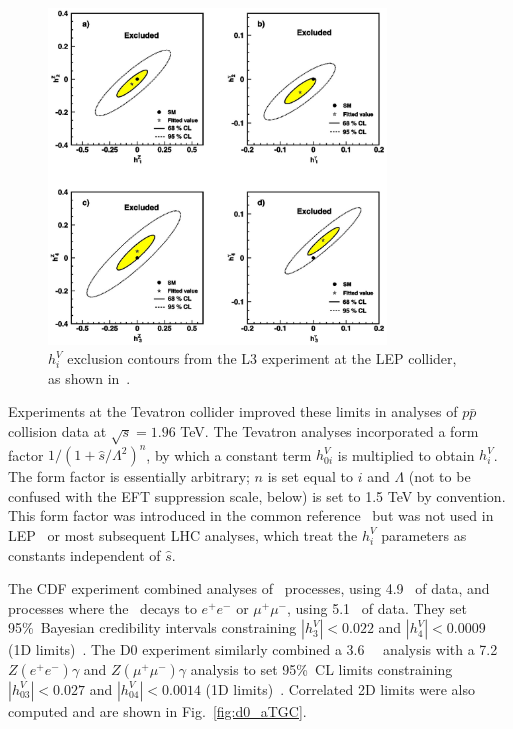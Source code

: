 \documentclass[oneside, letterpaper, 12pt, oldfontcommands]{memoir}
\begin{document}
\begin{figure}[hbtp]
  \begin{center}
    \includegraphics[width=0.8\textwidth]{Figures/L3_atgc_contours.jpg}
    \caption{
      $h_{i}^{V}$ exclusion contours from the L3 experiment at the LEP collider, as shown in~\cite{ref:j.physletb.2004.07.002}.
    }
    \label{fig:L3_atgc_contours}
  \end{center}
\end{figure}

Experiments at the Tevatron collider improved these limits in analyses of $p\bar{p}$ collision data at $\sqrt{s} = 1.96$ TeV.
The Tevatron analyses incorporated a form factor $1 / (1 + \hat{s}/\Lambda^{2})^{n}$, by which a constant term $h_{0i}^{V}$ is
multiplied to obtain $h_{i}^{V}$.
The form factor is essentially arbitrary; $n$ is set equal to $i$ and $\Lambda$ (not to be confused with the EFT suppression scale, below)
is set to 1.5 TeV by convention. This form factor was introduced in the common reference~\cite{ref:PhysRevD.47.4889} but was not used in LEP~\cite{ref:j.physrep.2013.07.004}
or most subsequent LHC analyses, which treat the $h_{i}^{V}$ parameters as constants independent of $\hat{s}$.

The CDF experiment combined analyses of \zinvg\ processes, using 4.9 \fbinv\ of data, and processes where the \PZ\ decays to
$e^\mathrm{+}e^\mathrm{-}$ or $\mu^\mathrm{+}\mu^\mathrm{-}$, using 5.1 \fbinv\ of data.
They set 95\%\ Bayesian credibility intervals constraining $|h_{3}^{V}| < 0.022$ and $|h_{4}^{V}| < 0.0009$ (1D limits)~\cite{ref:PhysRevLett.107.051802}.
The D0 experiment similarly combined a 3.6 \fbinv\ \zinvg\ analysis with a 7.2
\fbinv\ $Z(e^\mathrm{+}e^\mathrm{-})\gamma$ and $Z(\mu^\mathrm{+}\mu^\mathrm{-})\gamma$ analysis to set 95\%\ CL limits constraining
$|h_{03}^{V}| < 0.027$ and $|h_{04}^{V}| < 0.0014$ (1D limits)~\cite{ref:PhysRevD.85.052001}. Correlated 2D limits were also
computed and are shown in Fig.~\ref{fig:d0_aTGC}.
\end{document}
